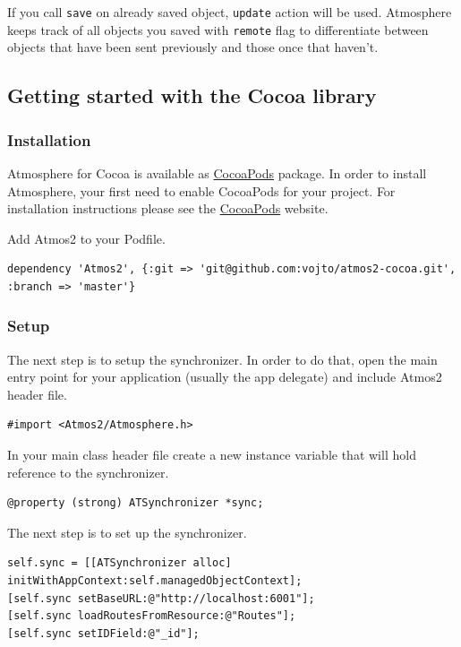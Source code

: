 If you call \texttt{save} on already saved object, \texttt{update} action will be used. Atmosphere keeps track of all objects you saved with \texttt{remote} flag to differentiate between objects that have been sent previously and those once that haven't.

\subsection{Getting started with the Cocoa library}

\subsubsection{Installation}

Atmosphere for Cocoa is available as \href{http://cocoapods.org/}{CocoaPods} package. In order to install Atmosphere, your first need to enable CocoaPods for your project. For installation instructions please see the \href{http://cocoapods.org/}{CocoaPods} website.

Add Atmos2 to your Podfile.

\begin{lstlisting}[caption=Adding Atmos2 to your Podfile]
dependency 'Atmos2', {:git => 'git@github.com:vojto/atmos2-cocoa.git', :branch => 'master'}
\end{lstlisting}

\subsubsection{Setup}

The next step is to setup the synchronizer. In order to do that, open the main entry point for your application (usually the app delegate) and include Atmos2 header file.

\begin{lstlisting}[caption=Including Atmos2 header file]
#import <Atmos2/Atmosphere.h>
\end{lstlisting}

In your main class header file create a new instance variable that will hold reference to the synchronizer.

\begin{lstlisting}[caption=Adding instance variable for synchronizer]
@property (strong) ATSynchronizer *sync;
\end{lstlisting}

The next step is to set up the synchronizer.

\begin{lstlisting}[caption=Setting up the synchronizer, label=lst3]
self.sync = [[ATSynchronizer alloc] initWithAppContext:self.managedObjectContext];
[self.sync setBaseURL:@"http://localhost:6001"];
[self.sync loadRoutesFromResource:@"Routes"];
[self.sync setIDField:@"_id"];
\end{lstlisting}

